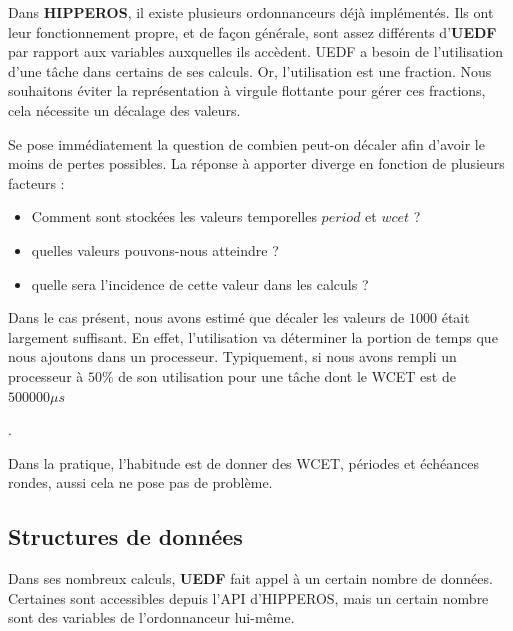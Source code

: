 		Dans \textbf{HIPPEROS}, il existe plusieurs ordonnanceurs déjà implémentés. 
		Ils ont leur fonctionnement propre, et de façon générale, sont assez différents d'\textbf{UEDF} par 
		rapport aux variables auxquelles ils accèdent. 
		UEDF a besoin de l'utilisation d'une tâche dans certains de ses calculs. Or, l'utilisation 
		est une fraction. Nous souhaitons éviter la représentation à virgule flottante 
		pour gérer ces fractions, cela nécessite un décalage des valeurs.
		 
		Se pose immédiatement la question de combien peut-on décaler afin d'avoir le moins de pertes possibles. 
		La réponse à apporter diverge en fonction de plusieurs facteurs :\newline
		\begin{itemize}
			\setlength\itemsep{0.1em}
			\item Comment sont stockées les valeurs temporelles $period$ et $wcet$ ?
			\item quelles valeurs pouvons-nous atteindre ?
			\item quelle sera l'incidence de cette valeur dans les calculs ?
		\end{itemize}
		Dans le cas présent, nous avons estimé que décaler les valeurs de $1000$ était largement suffisant. 
		En effet, l'utilisation va déterminer la portion de temps que 
		nous ajoutons dans un processeur. 
		Typiquement, si nous avons \og{}rempli\fg{} un processeur à $50\%$ de son utilisation pour une 
		tâche dont le WCET est de $500000 \mu s$
		
		.
		
		Dans la pratique, l'habitude est de donner des WCET, périodes et échéances \og{}rondes\fg{}, aussi 
		cela ne pose pas de problème.
		
		
	\subsection{Structures de données}
		Dans ses nombreux calculs, \textbf{UEDF} fait appel à un certain nombre de données.
		Certaines sont accessibles depuis l'API d'HIPPEROS, mais un certain nombre sont 
		des variables de l'ordonnanceur lui-même.\newline
		
